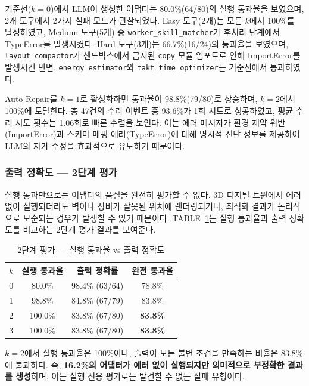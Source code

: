 \documentclass[conference]{IEEEtran}
\begin{document}
기준선($k{=}0$)에서 LLM이 생성한 어댑터는 80.0\%(64/80)의 실행 통과율을 보였으며, 2개 도구에서 2가지 실패 모드가 관찰되었다. Easy 도구(2개)는 모든 $k$에서 100\%를 달성하였고, Medium 도구(5개) 중 \texttt{worker\_skill\_matcher}가 후처리 단계에서 TypeError를 발생시켰다. Hard 도구(3개)는 66.7\%(16/24)의 통과율을 보였으며, \texttt{layout\_compactor}가 샌드박스에서 금지된 \texttt{copy} 모듈 임포트로 인해 ImportError를 발생시킨 반면, \texttt{energy\_estimator}와 \texttt{takt\_time\_optimizer}는 기준선에서 통과하였다.

Auto-Repair를 $k{=}1$로 활성화하면 통과율이 98.8\%(79/80)로 상승하며, $k{=}2$에서 100\%에 도달한다. 총 47건의 수리 이벤트 중 93.6\%가 1회 시도로 성공하였고, 평균 수리 시도 횟수는 1.06회로 빠른 수렴을 보인다. 이는 에러 메시지가 환경 제약 위반(ImportError)과 스키마 매핑 에러(TypeError)에 대해 명시적 진단 정보를 제공하여 LLM의 자가 수정을 효과적으로 유도하기 때문이다.

\subsubsection{출력 정확도 --- 2단계 평가}

실행 통과만으로는 어댑터의 품질을 완전히 평가할 수 없다. 3D 디지털 트윈에서 에러 없이 실행되더라도 벽이나 장비가 잘못된 위치에 렌더링되거나, 최적화 결과가 논리적으로 모순되는 경우가 발생할 수 있기 때문이다. TABLE~\ref{tab:two_tier}는 실행 통과율과 출력 정확도를 비교하는 2단계 평가 결과를 보여준다.

\begin{table}[!t]
\caption{2단계 평가 --- 실행 통과율 vs 출력 정확도}
\label{tab:two_tier}
\centering
\begin{tabular}{c c c c}
\hline
$k$ & \textbf{실행 통과율} & \textbf{출력 정확률} & \textbf{완전 통과율} \\
\hline
0 & 80.0\%  & 98.4\% (63/64)  & 78.8\% \\
1 & 98.8\%  & 84.8\% (67/79)  & 83.8\% \\
2 & 100.0\% & 83.8\% (67/80)  & \textbf{83.8\%} \\
3 & 100.0\% & 83.8\% (67/80)  & \textbf{83.8\%} \\
\hline
\end{tabular}
\end{table}

$k{=}2$에서 실행 통과율은 100\%이나, 출력이 모든 불변 조건을 만족하는 비율은 83.8\%에 불과하다. 즉, \textbf{16.2\%의 어댑터가 에러 없이 실행되지만 의미적으로 부정확한 결과를 생성}하며, 이는 실행 전용 평가로는 발견할 수 없는 실패 유형이다.
\end{document}
